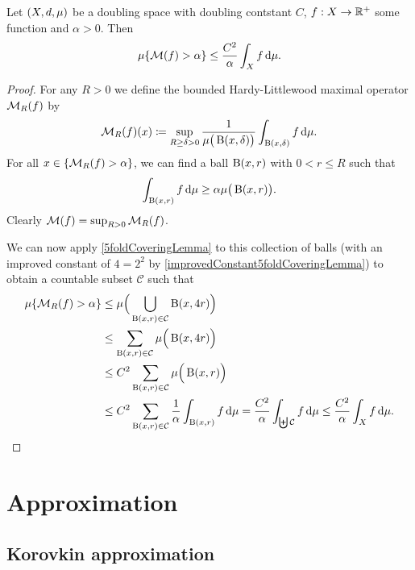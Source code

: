 \begin{proposition}
Let $\sSet{X,d, \mu}$ be a doubling space with doubling contstant $C$, $f: X\to \mathbb{R}^+$ some function and $\alpha > 0$. Then
\[ \mu\{\operatorname{\mathcal{M}}(f) > \alpha\} \leq \frac{C^2}{\alpha}\int_{X}f\operatorname{d \!}{\mu}. \]
\end{proposition}
\begin{proof}
For any $R>0$ we define the bounded Hardy-Littlewood maximal operator $\operatorname{\mathcal{M}}_R(f)$ by
\[ \operatorname{\mathcal{M}}_R(f)(x) \coloneqq \sup_{R\geq\delta >0}\frac{1}{\mu\big(\operatorname{B}(x,\delta)\big)}\int_{\operatorname{B}(x,\delta)} f \operatorname{d \!}{\mu}. \]
For all $x\in \{\operatorname{\mathcal{M}}_R(f) > \alpha\}$, we can find a ball $\operatorname{B}(x,r)$ with $0<r\leq R$ such that
\[ \int_{\operatorname{B}(x,r)}f \operatorname{d \!}{\mu} \geq \alpha\mu\big(\operatorname{B}(x,r)\big). \]
Clearly $\operatorname{\mathcal{M}}(f) = \sup_{R>0}\operatorname{\mathcal{M}}_R(f)$.

We can now apply \ref{5foldCoveringLemma} to this collection of balls (with an improved constant of $4 = 2^2$ by \ref{improvedConstant5foldCoveringLemma}) to obtain a countable subset $\mathcal{C}$ such that
\begin{align*}
\mu\{\operatorname{\mathcal{M}}_R(f) > \alpha\} &\leq \mu\Big(\bigcup_{\operatorname{B}(x,r)\in \mathcal{C}}\operatorname{B}(x,4r)\Big) \\
&\leq \sum_{\operatorname{B}(x,r)\in \mathcal{C}}\mu\Big(\operatorname{B}(x,4r)\Big) \\
&\leq C^2\sum_{\operatorname{B}(x,r)\in \mathcal{C}}\mu\Big(\operatorname{B}(x,r)\Big) \\
&\leq C^2\sum_{\operatorname{B}(x,r)\in \mathcal{C}}\frac{1}{\alpha}\int_{\operatorname{B}(x,r)}f \operatorname{d \!}{\mu} = \frac{C^2}{\alpha}\int_{\biguplus \mathcal{C}} f \operatorname{d \!}{\mu} \leq \frac{C^2}{\alpha}\int_{X} f \operatorname{d \!}{\mu}.
\end{align*} 



\end{proof}
\begin{corollary}

\end{corollary}

\section{Approximation}
\subsection{Korovkin approximation}

